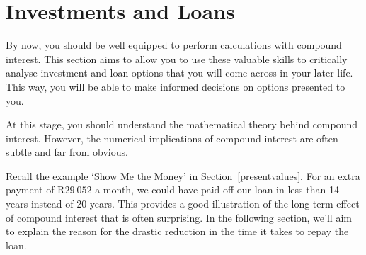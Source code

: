 
\section{Investments and Loans}
\label{s:investmentandloans}

By now, you should be well equipped to perform calculations with compound interest. This section aims to allow you to use these valuable skills to critically analyse investment and loan options that you will come across in your later life. This way, you will be able to make informed decisions on options presented to you.

At this stage, you should understand the mathematical theory behind compound interest. However, the numerical implications of compound interest are often subtle and far from obvious.

Recall the example `Show Me the Money' in Section~\ref{presentvalues}. For an extra payment of R$29~052$ a month, we could have paid off our loan in less than 14 years instead of 20 years. This provides a good illustration of the long term effect of compound interest that is often surprising. In the following section, we'll aim to explain the reason for the drastic reduction in the time it takes to repay the loan.

